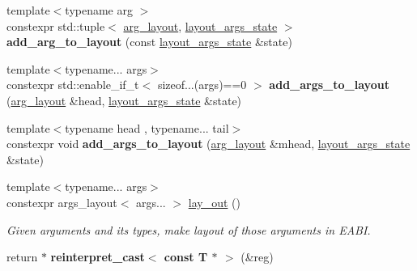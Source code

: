\begin{DoxyCompactItemize}
\item 
\mbox{\label{namespaceeka2l1_1_1hle_a06185d833847528778be55e53d903e7a}} 
{\footnotesize template$<$typename arg $>$ }\\constexpr std\+::tuple$<$ \mbox{\hyperlink{structeka2l1_1_1hle_1_1arg__layout}{arg\+\_\+layout}}, \mbox{\hyperlink{structeka2l1_1_1hle_1_1layout__args__state}{layout\+\_\+args\+\_\+state}} $>$ {\bfseries add\+\_\+arg\+\_\+to\+\_\+layout} (const \mbox{\hyperlink{structeka2l1_1_1hle_1_1layout__args__state}{layout\+\_\+args\+\_\+state}} \&state)
\item 
\mbox{\label{namespaceeka2l1_1_1hle_a611c15aef48cf624fa5c4c60066f52e2}} 
{\footnotesize template$<$typename... args$>$ }\\constexpr std\+::enable\+\_\+if\+\_\+t$<$ sizeof...(args)==0 $>$ {\bfseries add\+\_\+args\+\_\+to\+\_\+layout} (\mbox{\hyperlink{structeka2l1_1_1hle_1_1arg__layout}{arg\+\_\+layout}} \&head, \mbox{\hyperlink{structeka2l1_1_1hle_1_1layout__args__state}{layout\+\_\+args\+\_\+state}} \&state)
\item 
\mbox{\label{namespaceeka2l1_1_1hle_aff410ec1cd04cd8b6f3a1e1e24e7a9c1}} 
{\footnotesize template$<$typename head , typename... tail$>$ }\\constexpr void {\bfseries add\+\_\+args\+\_\+to\+\_\+layout} (\mbox{\hyperlink{structeka2l1_1_1hle_1_1arg__layout}{arg\+\_\+layout}} \&mhead, \mbox{\hyperlink{structeka2l1_1_1hle_1_1layout__args__state}{layout\+\_\+args\+\_\+state}} \&state)
\item 
\mbox{\label{namespaceeka2l1_1_1hle_afd67044557902225d8870565309b7cb6}} 
{\footnotesize template$<$typename... args$>$ }\\constexpr args\+\_\+layout$<$ args... $>$ \mbox{\hyperlink{namespaceeka2l1_1_1hle_afd67044557902225d8870565309b7cb6}{lay\+\_\+out}} ()
\begin{DoxyCompactList}\small\item\em Given arguments and its types, make layout of those arguments in E\+A\+BI. \end{DoxyCompactList}\item 
\mbox{\label{namespaceeka2l1_1_1hle_a6e45a35e535e733df6cb8322a76f66ef}} 
return $\ast$ {\bfseries reinterpret\+\_\+cast$<$ const T $\ast$ $>$} (\&reg)

\end{DoxyCompactItemize}
